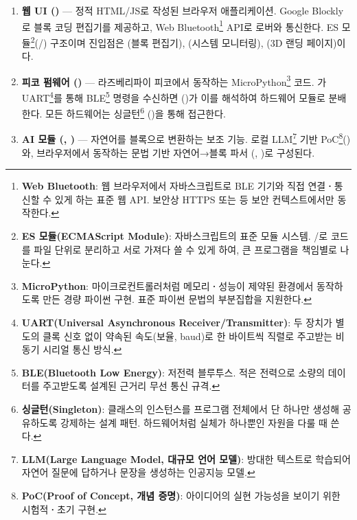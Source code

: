 \begin{enumerate}
  \item \textbf{웹 UI ()} --- 정적 HTML/JS로 작성된 브라우저 애플리케이션.
        Google Blockly로 블록 코딩 편집기를 제공하고, Web Bluetooth\footnote{\textbf{Web
        Bluetooth}: 웹 브라우저에서 자바스크립트로 BLE 기기와 직접 연결\textbf{·}통신할 수
        있게 하는 표준 웹 API. 보안상 HTTPS 또는  등 보안 컨텍스트에서만
        동작한다.} API로 로버와 통신한다. ES 모듈\footnote{\textbf{ES 모듈(ECMAScript
        Module)}: 자바스크립트의 표준 모듈 시스템. /로 코드를 파일
        단위로 분리하고 서로 가져다 쓸 수 있게 하여, 큰 프로그램을 책임별로 나눈다.}(/) 구조이며 진입점은
        (블록 편집기), (시스템 모니터링),
        (3D 랜딩 페이지)이다.
  \item \textbf{피코 펌웨어 ()} --- 라즈베리파이 피코에서 동작하는
        MicroPython\footnote{\textbf{MicroPython}: 마이크로컨트롤러처럼 메모리\textbf{·}성능이
        제약된 환경에서 동작하도록 만든 경량 파이썬 구현. 표준 파이썬 문법의 부분집합을 지원한다.}
        코드. 가 UART\footnote{\textbf{UART(Universal Asynchronous
        Receiver/Transmitter)}: 두 장치가 별도의 클록 신호 없이 약속된 속도(보율, baud)로
        한 바이트씩 직렬로 주고받는 비동기 시리얼 통신 방식.}를 통해 BLE\footnote{\textbf{BLE(Bluetooth
        Low Energy)}: 저전력 블루투스. 적은 전력으로 소량의 데이터를 주고받도록 설계된 근거리
        무선 통신 규격.} 명령을 수신하면
        ()가 이를 해석하여
        하드웨어 모듈로 분배한다. 모든 하드웨어는 싱글턴\footnote{\textbf{싱글턴(Singleton)}:
        클래스의 인스턴스를 프로그램 전체에서 단 하나만 생성해 공유하도록 강제하는 설계 패턴.
        하드웨어처럼 실체가 하나뿐인 자원을 다룰 때 쓴다.} 
        ()을 통해 접근한다.
  \item \textbf{AI 모듈 (, )} --- 자연어를
        블록으로 변환하는 보조 기능. 로컬 LLM\footnote{\textbf{LLM(Large Language Model,
        대규모 언어 모델)}: 방대한 텍스트로 학습되어 자연어 질문에 답하거나 문장을 생성하는
        인공지능 모델.} 기반 PoC\footnote{\textbf{PoC(Proof of Concept, 개념 증명)}:
        아이디어의 실현 가능성을 보이기 위한 시험적\textbf{·}초기 구현.}()와,
        브라우저에서 동작하는 문법 기반 자연어→블록 파서
        (, )로 구성된다.
\end{enumerate}

